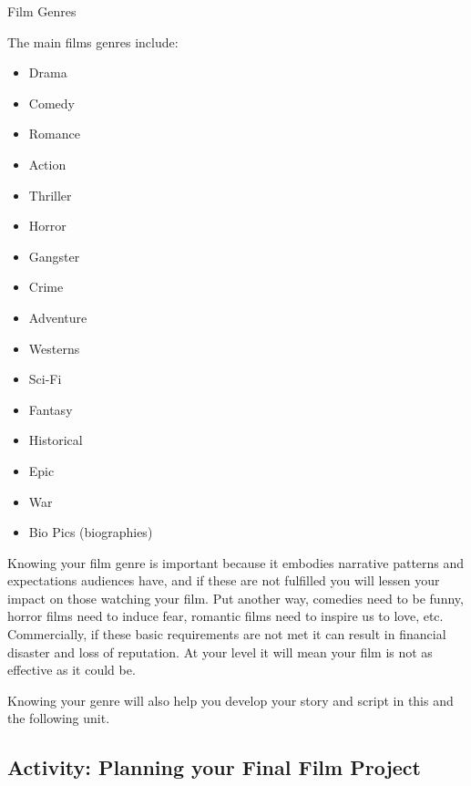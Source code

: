 \documentclass[
]{book}
\providecommand{\tightlist}{%
  \setlength{\itemsep}{0pt}\setlength{\parskip}{0pt}}
\begin{document}
{Film Genres}

The main films genres include:

\begin{itemize}
\tightlist
\item
  Drama\\
\item
  Comedy\\
\item
  Romance\\
\item
  Action\\
\item
  Thriller\\
\item
  Horror\\
\item
  Gangster\\
\item
  Crime\\
\item
  Adventure\\
\item
  Westerns\\
\item
  Sci-Fi\\
\item
  Fantasy\\
\item
  Historical\\
\item
  Epic\\
\item
  War\\
\item
  Bio Pics (biographies)
\end{itemize}

Knowing your film genre is important because it embodies narrative patterns and expectations audiences have, and if these are not fulfilled you will lessen your impact on those watching your film. Put another way, comedies need to be funny, horror films need to induce fear, romantic films need to inspire us to love, etc. Commercially, if these basic requirements are not met it can result in financial disaster and loss of reputation. At your level it will mean your film is not as effective as it could be.

Knowing your genre will also help you develop your story and script in this and the following unit.

\hypertarget{activity-planning-your-final-film-project}{%
\subsection*{Activity: Planning your Final Film Project}\label{activity-planning-your-final-film-project}}
\end{document}

